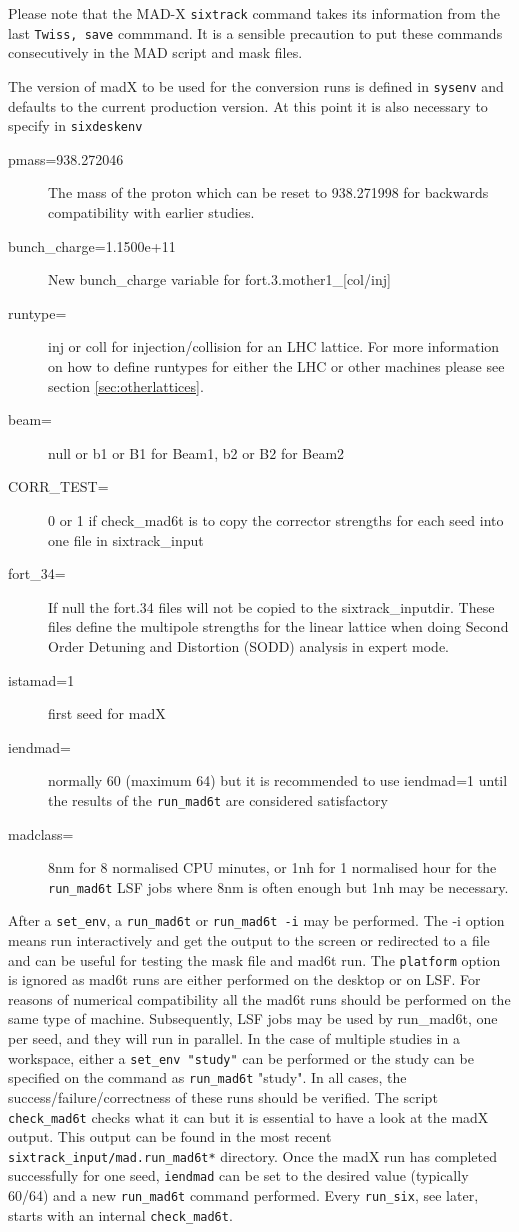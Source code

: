 \documentclass{cernatsnote}    %
\begin{document}
Please note that the MAD-X {\tt sixtrack} command takes its
information from the last {\tt Twiss, save} commmand. It is a
sensible precaution to put these commands consecutively in the MAD
script and mask files.

The version of madX to be used for the conversion runs is defined
in {\tt sysenv} and defaults to the current production version.
At this point it is also necessary to specify in {\tt sixdeskenv}
\begin{description}
\item [pmass=938.272046] The mass of the proton \cite{NIST} which can be reset to
938.271998 for backwards compatibility with earlier studies.
\item [bunch\_charge=1.1500e+11] New bunch\_charge variable for fort.3.mother1\_[col/inj]
\item [runtype=] inj or coll for injection/collision for an LHC lattice.
For more information on how to define runtypes
for either the LHC or other machines please see section \ref{sec:otherlattices}.
\item [beam=] null or b1 or B1 for Beam1, b2 or B2 for Beam2
\item [CORR\_TEST=]0 or 1 if check\_mad6t is to copy the corrector strengths
for each seed into one file in sixtrack\_input
\item [fort\_34=] If null the fort.34 files will not be copied 
to the sixtrack\_inputdir. These files define the multipole strengths for the
linear lattice when doing Second Order Detuning and Distortion (SODD)
 analysis in expert mode.
\item [istamad=1] first seed for madX
\item [iendmad=] normally 60 (maximum 64) but it is recommended to use 
iendmad=1 until the results of the {\tt run\_mad6t} are considered satisfactory
\item[madclass=] 8nm for 8 normalised CPU minutes, or 1nh for 1 normalised hour
for the {\tt run\_mad6t} LSF jobs where 8nm is often enough but 1nh may be
necessary.
\end{description}
After a {\tt set\_env}, a {\tt run\_mad6t} or {\tt run\_mad6t -i} may be performed.
The -i option means run interactively and get the output to the screen or
redirected to a file and can be useful for testing the mask file and mad6t run.
The {\tt platform} option is ignored as mad6t runs are either performed on 
the desktop or on LSF. For reasons of numerical compatibility all the {mad6t}  
runs should be performed on the same type of machine.
Subsequently, LSF jobs may be used by {run\_mad6t}, one per seed, and they will
run in parallel. 
In the case of multiple studies in a workspace, either a {\tt set\_env "study"} 
can be performed or the study can be specified on the command as 
{\tt run\_mad6t} "study".
In all cases, the success/failure/correctness of these runs should
be verified. The script {\tt check\_mad6t} checks what it can but it is
essential to have a look at the madX output. This output can be found in the
most recent {\tt sixtrack\_input/mad.run\_mad6t*} directory.
Once the madX run has completed successfully for one seed, {\tt iendmad}
can be set to the desired value (typically 60/64) and a new {\tt run\_mad6t} command
performed. Every {\tt run\_six}, see later, starts with an internal {\tt check\_mad6t}.
\end{document}
